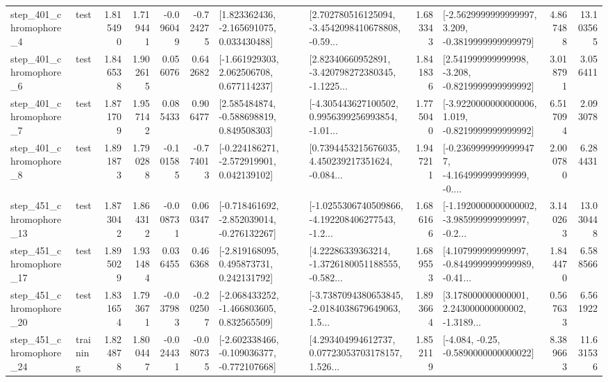 \begin{tabular}{llrrrrllrlrr}
   step\_401\_chromophore\_4 &      test &      1.815490 &    1.719441 &     -0.096049 & -0.724275 &    [1.823362436, -2.165691075, 0.033430488] &  [2.702780516125094, -3.4542098410678808, -0.59... &       1.683343 &  [-2.5629999999999997, 3.209, -0.3819999999999979] &            4.867488 &         13.103565 \\
   step\_401\_chromophore\_6 &      test &      1.846538 &    1.902615 &      0.056076 &  0.642682 &    [-1.661929303, 2.062506708, 0.677114237] &  [2.82340660952891, -3.420798272380345, -1.1225... &       1.841836 &   [2.541999999999998, -3.208, -0.8219999999999992] &            3.018791 &          3.056411 \\
   step\_401\_chromophore\_7 &      test &      1.871709 &    1.957142 &      0.085433 &  0.906477 &    [2.585484874, -0.588698819, 0.849508303] &  [-4.305443627100502, 0.9956399256993854, -1.01... &       1.775040 &  [-3.9220000000000006, 1.019, -0.8219999999999992] &            6.517094 &          2.093078 \\
   step\_401\_chromophore\_8 &      test &      1.891873 &    1.790288 &     -0.101585 & -0.774013 &   [-0.224186271, -2.572919901, 0.042139102] &  [0.7394453215676035, 4.450239217351624, -0.084... &       1.947211 &  [-0.23699999999999477, -4.164999999999999, -0.... &            2.000780 &          6.284431 \\
  step\_451\_chromophore\_13 &      test &      1.873042 &    1.864312 &     -0.008731 &  0.060347 &  [-0.718461692, -2.852039014, -0.276132267] &  [-1.0255306740509866, -4.192208406277543, -1.2... &       1.686166 &  [-1.1920000000000002, -3.985999999999997, -0.2... &            3.140263 &         13.030448 \\
  step\_451\_chromophore\_17 &      test &      1.895029 &    1.931484 &      0.036455 &  0.466368 &    [-2.819168095, 0.495873731, 0.242131792] &  [4.22286339363214, -1.3726180051188555, -0.582... &       1.689553 &  [4.107999999999997, -0.8449999999999989, -0.41... &            1.844470 &          6.588566 \\
  step\_451\_chromophore\_20 &      test &      1.831654 &    1.793671 &     -0.037983 & -0.202507 &   [-2.068433252, -1.466803605, 0.832565509] &  [-3.7387094380653845, -2.0184038679649063, 1.5... &       1.893664 &  [3.178000000000001, 2.243000000000002, -1.3189... &            0.567633 &          6.561922 \\
  step\_451\_chromophore\_24 &  training &      1.824878 &    1.800447 &     -0.024431 & -0.080735 &  [-2.602338466, -0.109036377, -0.772107668] &  [4.293404994612737, 0.07723053703178157, 1.526... &       1.852119 &               [-4.084, -0.25, -0.5890000000000022] &            8.389663 &         11.631536 \\

\end{tabular}
